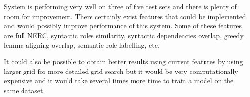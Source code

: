 \documentclass[10pt, a4paper]{article}
\begin{document}
System is performing very well on three of five test sets and there is plenty of room for improvement. There certainly exist features that could be implemented and would possibly improve performance of this system. Some of these features are full NERC, syntactic roles similarity, syntactic dependencies overlap, greedy lemma aligning overlap, semantic role labelling, etc.

It could also be possible to obtain better results using current features by using larger grid for more detailed grid search but it would be very computationally expensive and it would take several times more time to train a model on the same dataset.

\nocite{*}

 
\end{document}
